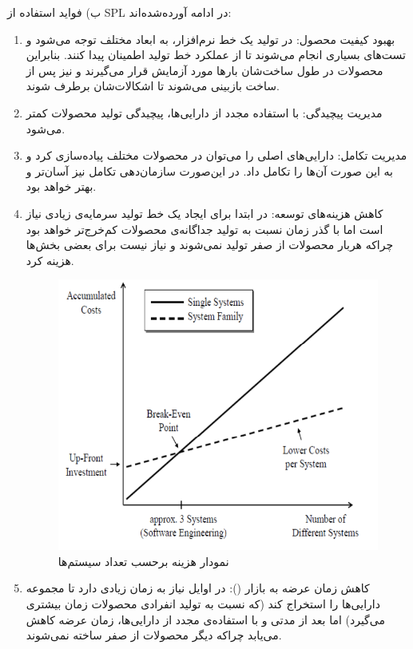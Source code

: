 {ب) فواید استفاده از SPL در ادامه آورده‌شده‌اند:
\begin{enumerate}

\item 
بهبود کیفیت محصول: در تولید یک خط نرم‌افزار، به ابعاد مختلف توجه می‌شود و تست‌های بسیاری انجام می‌شوند تا از عملکرد خط تولید اطمینان پیدا کنند. بنابراین محصولات در طول ساخت‌شان بارها مورد آزمایش قرار می‌گیرند و نیز پس از ساخت‌ بازبینی می‌شوند تا اشکالات‌شان برطرف شوند.
\item 
مدیریت پیچیدگی: با استفاده‌ مجدد از دارایی‌ها، پیچیدگی تولید محصولات کمتر می‌شود.
\item
مدیریت تکامل: دارایی‌های اصلی را می‌توان در محصولات مختلف پیاده‌سازی کرد و به این صورت آن‌ها را تکامل داد. در این‌صورت سازمان‌دهی تکامل نیز آسان‌تر و بهتر خواهد بود.
\item 
کاهش هزینه‌های توسعه: در ابتدا برای ایجاد یک خط تولید سرمایه‌ی زیادی نیاز است اما با گذر زمان نسبت به تولید جداگانه‌ی محصولات کم‌خرج‌تر خواهد بود چراکه هربار محصولات از صفر تولید نمی‌شوند و نیاز نیست برای بعضی بخش‌ها هزینه‌ کرد.
\begin{figure}[h]
	\centering
	\includegraphics[scale=0.55]{figs/1-1}
	\caption{نمودار هزینه‌ برحسب تعداد سیستم‌ها}
\end{figure}

\item 
کاهش زمان عرضه به بازار  ():
در اوایل  نیاز به زمان زیادی دارد تا مجموعه دارایی‌ها را استخراج کند (که نسبت به تولید انفرادی محصولات زمان بیشتری می‌گیرد) اما بعد از مدتی و با استفاده‌ی مجدد از دارایی‌ها، زمان عرضه کاهش می‌یابد چراکه دیگر محصولات از صفر ساخته نمی‌شوند.


\end{enumerate}}
